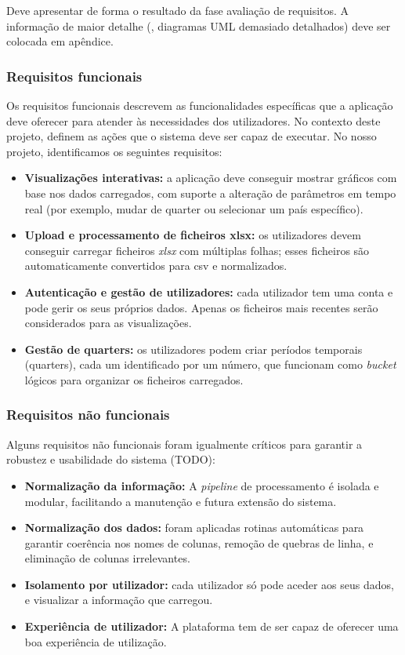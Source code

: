 Deve apresentar de forma  o resultado da fase avaliação de requisitos. A informação de maior detalhe (\eg, diagramas UML demasiado detalhados) deve ser colocada em apêndice.

\subsubsection{Requisitos funcionais}
Os requisitos funcionais descrevem as funcionalidades específicas que a aplicação deve oferecer para atender às necessidades dos utilizadores. No contexto deste projeto, definem as ações que o sistema deve ser capaz de executar. No nosso projeto, identificamos os seguintes requisitos:

\begin{itemize}
    \item \textbf{Visualizações interativas:} a aplicação deve conseguir mostrar gráficos com base nos dados carregados, com suporte a alteração de parâmetros em tempo real (por exemplo, mudar de quarter ou selecionar um país específico).
    \item \textbf{Upload e processamento de ficheiros \gls{xlsx}:} os utilizadores devem conseguir carregar ficheiros \textit{\gls{xlsx}} com múltiplas folhas; esses ficheiros são automaticamente convertidos para \gls{csv} e normalizados.
    \item \textbf{Autenticação e gestão de utilizadores:} cada utilizador tem uma conta e pode gerir os seus próprios dados. Apenas os ficheiros mais recentes serão considerados para as visualizações.
    \item \textbf{Gestão de quarters:} os utilizadores podem criar períodos temporais (quarters), cada um identificado por um número, que funcionam como \textit{bucket} lógicos para organizar os ficheiros carregados.
\end{itemize}

\subsubsection{Requisitos não funcionais}

Alguns requisitos não funcionais foram igualmente críticos para garantir a robustez e usabilidade do sistema (TODO):

\begin{itemize}
    \item \textbf{Normalização da informação: } A \textit{pipeline} de processamento é isolada e modular, facilitando a manutenção e futura extensão do sistema.
    \item \textbf{Normalização dos dados:} foram aplicadas rotinas automáticas para garantir coerência nos nomes de colunas, remoção de quebras de linha, e eliminação de colunas irrelevantes.
    \item \textbf{Isolamento por utilizador:} cada utilizador só pode aceder aos seus dados, e visualizar a informação que carregou.
    \item \textbf{Experiência de utilizador:} A plataforma tem de  ser capaz de oferecer uma boa experiência de utilização.
\end{itemize}

